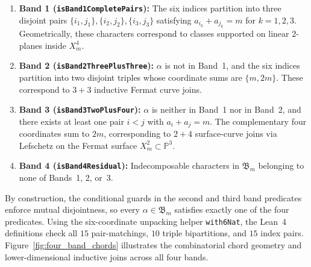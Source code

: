 \documentclass[11pt,a4paper]{article}
\begin{document}
\begin{enumerate}
  \item \textbf{Band 1 (\texttt{isBand1CompletePairs}):} The six indices partition into three disjoint pairs $\{i_1, j_1\}, \{i_2, j_2\}, \{i_3, j_3\}$ satisfying $a_{i_k} + a_{j_k} = m$ for $k = 1, 2, 3$. Geometrically, these characters correspond to classes supported on linear $2$-planes inside $X_m^4$.
  \item \textbf{Band 2 (\texttt{isBand2ThreePlusThree}):} $\alpha$ is not in Band~1, and the six indices partition into two disjoint triples whose coordinate sums are $\{m, 2m\}$. These correspond to $3+3$ inductive Fermat curve joins.
  \item \textbf{Band 3 (\texttt{isBand3TwoPlusFour}):} $\alpha$ is neither in Band~1 nor in Band~2, and there exists at least one pair $i < j$ with $a_i + a_j = m$. The complementary four coordinates sum to $2m$, corresponding to $2+4$ surface-curve joins via Lefschetz on the Fermat surface $X_m^2 \subset \mathbb{P}^3$.
  \item \textbf{Band 4 (\texttt{isBand4Residual}):} Indecomposable characters in $\mathfrak{B}_m$ belonging to none of Bands~1, 2, or~3.
\end{enumerate}

By construction, the conditional guards in the second and third band predicates enforce mutual disjointness, so every $\alpha \in \mathfrak{B}_m$ satisfies exactly one of the four predicates. Using the six-coordinate unpacking helper \texttt{with6Nat}, the Lean~4 definitions check all $15$ pair-matchings, $10$ triple bipartitions, and $15$ index pairs. Figure~\ref{fig:four_band_chords} illustrates the combinatorial chord geometry and lower-dimensional inductive joins across all four bands.
\end{document}
